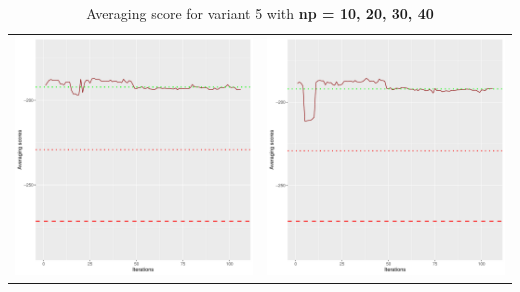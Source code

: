 \documentclass[]{scrartcl}
\begin{document}
\begin{table}[h!]
\begin{tabular}{cc}
\includegraphics[scale = 0.4]{./figs/asia/v5/30/avgBoundsEvolution-107.pdf} & 
\includegraphics[scale = 0.4]{./figs/asia/v5/40/avgBoundsEvolution-107.pdf} \\
\end{tabular}
\caption{Averaging score for variant 5 with \textbf{np =  10, 20, 30, 40}}
\end{table}
\end{document}
